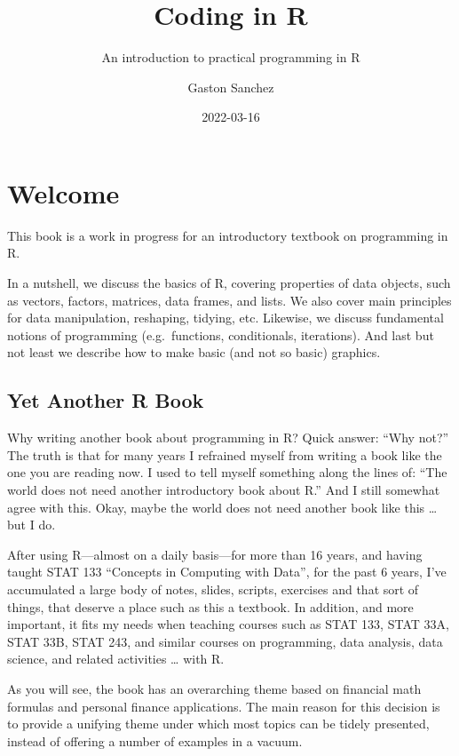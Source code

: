 \documentclass[
]{book}
\title{Coding in R}
\subtitle{An introduction to practical programming in R}
\author{Gaston Sanchez}
\date{2022-03-16}
\begin{document}
\maketitle

{
\setcounter{tocdepth}{1}
\tableofcontents
}
\hypertarget{welcome}{%
\chapter*{Welcome}\label{welcome}}

This book is a work in progress for an introductory textbook on programming in R.

In a nutshell, we discuss the basics of R, covering properties of data objects,
such as vectors, factors, matrices, data frames, and lists. We also cover
main principles for data manipulation, reshaping, tidying, etc. Likewise, we
discuss fundamental notions of programming (e.g.~functions, conditionals,
iterations). And last but not least we describe how to make basic (and not so
basic) graphics.

\hypertarget{yet-another-r-book}{%
\section*{Yet Another R Book}\label{yet-another-r-book}}

Why writing another book about programming in R? Quick answer: ``Why not?''
The truth is that for many years I refrained myself from writing a book like
the one you are reading now. I used to tell myself something along the lines
of: ``The world does not need another introductory book about R.'' And I still
somewhat agree with this. Okay, maybe the world does not need another book
like this \ldots{} but I do.

After using R---almost on a daily basis---for more than 16 years, and
having taught STAT 133 ``Concepts in Computing with Data'', for the past 6 years,
I've accumulated a large body of notes, slides, scripts, exercises and that
sort of things, that deserve a place such as this a textbook. In addition, and
more important, it fits my needs when teaching courses such as STAT 133, STAT 33A,
STAT 33B, STAT 243, and similar courses on programming, data analysis, data
science, and related activities \ldots{} with R.

As you will see, the book has an overarching theme based on financial math
formulas and personal finance applications. The main reason for this decision
is to provide a unifying theme under which most topics can be tidely presented,
instead of offering a number of examples in a vacuum.
\end{document}
